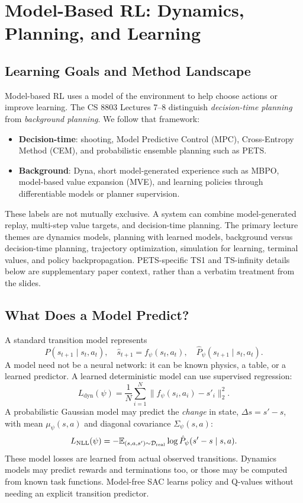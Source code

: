 \chapter{Model-Based RL: Dynamics, Planning, and Learning}
\section{Learning Goals and Method Landscape}
Model-based RL uses a model of the environment to help choose actions or improve learning. The CS 8803 Lectures 7--8 distinguish \emph{decision-time planning} from \emph{background planning}. We follow that framework:
\begin{itemize}
\item \textbf{Decision-time}: shooting, Model Predictive Control (MPC), Cross-Entropy Method (CEM), and probabilistic ensemble planning such as PETS.
\item \textbf{Background}: Dyna, short model-generated experience such as MBPO, model-based value expansion (MVE), and learning policies through differentiable models or planner supervision.
\end{itemize}
These labels are not mutually exclusive. A system can combine model-generated replay, multi-step value targets, and decision-time planning.
The primary lecture themes are dynamics models, planning with learned models, background versus decision-time planning, trajectory optimization, simulation for learning, terminal values, and policy backpropagation. PETS-specific TS1 and TS-infinity details below are supplementary paper context, rather than a verbatim treatment from the slides.

\section{What Does a Model Predict?}
A standard transition model represents
\begin{equation}
P(s_{t+1}\mid s_t,a_t),\quad
\hat s_{t+1}=f_\psi(s_t,a_t),\quad
\hat P_\psi(s_{t+1}\mid s_t,a_t).
\end{equation}
A model need not be a neural network: it can be known physics, a table, or a learned predictor. A learned deterministic model can use supervised regression:
\begin{equation}
L_{\mathrm{dyn}}(\psi)=\frac1N\sum_{i=1}^{N}
\|f_\psi(s_i,a_i)-s'_i\|_2^2.
\end{equation}
A probabilistic Gaussian model may predict the \emph{change} in state, $\Delta s=s'-s$, with mean $\mu_\psi(s,a)$ and diagonal covariance $\Sigma_\psi(s,a)$:
\begin{equation}
L_{\mathrm{NLL}}(\psi)=-\mathbb{E}_{(s,a,s')\sim\mathcal{D}_{\mathrm{real}}}
\log\hat P_\psi(s'-s\mid s,a).
\end{equation}
These model losses are learned from actual observed transitions. Dynamics models may predict rewards and terminations too, or those may be computed from known task functions. Model-free SAC learns policy and Q-values without needing an explicit transition predictor.

